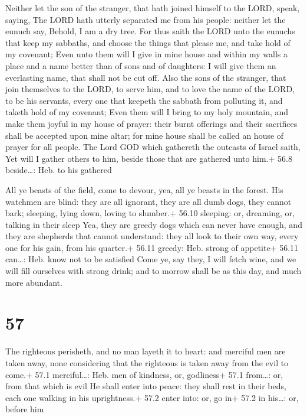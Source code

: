  Neither let the son of the stranger, that hath joined
himself to the LORD, speak, saying, The LORD hath utterly separated me
from his people: neither let the eunuch say, Behold, I am a dry tree.
 For thus saith the LORD unto the eunuchs that keep my
sabbaths, and choose the things that please me, and take hold of my
covenant;  Even unto them will I give in mine house and
within my walls a place and a name better than of sons and of daughters:
I will give them an everlasting name, that shall not be cut off.
 Also the sons of the stranger, that join themselves to the
LORD, to serve him, and to love the name of the LORD, to be his
servants, every one that keepeth the sabbath from polluting it, and
taketh hold of my covenant;  Even them will I bring to my
holy mountain, and make them joyful in my house of prayer: their burnt
offerings and their sacrifices shall be accepted upon mine altar; for
mine house shall be called an house of prayer for all people.
 The Lord GOD which gathereth the outcasts of Israel saith,
Yet will I gather others to him, beside those that are gathered unto
him.+ 56.8 beside\ldots: Heb. to his gathered

 All ye beasts of the field, come to devour, yea, all ye
beasts in the forest.  His watchmen are blind: they are all
ignorant, they are all dumb dogs, they cannot bark; sleeping, lying
down, loving to slumber.+ 56.10 sleeping: or, dreaming, or, talking in
their sleep  Yea, they are greedy dogs which can never have
enough, and they are shepherds that cannot understand: they all look to
their own way, every one for his gain, from his quarter.+ 56.11 greedy:
Heb. strong of appetite+ 56.11 can\ldots: Heb. know not to be satisfied
 Come ye, say they, I will fetch wine, and we will fill
ourselves with strong drink; and to morrow shall be as this day, and
much more abundant.

\hypertarget{section-56}{%
\section{57}\label{section-56}}

 The righteous perisheth, and no man layeth it to heart: and
merciful men are taken away, none considering that the righteous is
taken away from the evil to come.+ 57.1 merciful\ldots: Heb. men of
kindness, or, godliness+ 57.1 from\ldots: or, from that which is evil
 He shall enter into peace: they shall rest in their beds,
each one walking in his uprightness.+ 57.2 enter into: or, go in+ 57.2
in his\ldots: or, before him

